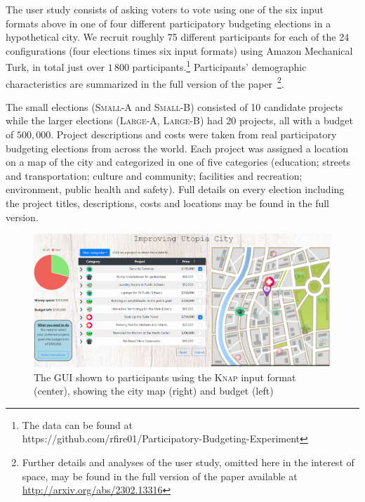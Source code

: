 \documentclass[letterpaper]{article} %
\newcommand{\kibitz}[2]{\ifnum\Comments=1{\color{#1}{#2}}\fi}
\newcommand{\gb}[1]{\kibitz{brown}{[GB:#1]}}
\newcommand{\knap}{\textsc{Knap}}
\begin{document}
The user study consists of asking voters to vote using one of the six input formats above in one of four different participatory budgeting elections in a hypothetical city. 
We recruit roughly 75  different participants for each of the 24 configurations (four elections times six input formats)   using Amazon Mechanical Turk, in total  just over $1\,800$ participants.\footnote{The data can be found at\\ https://github.com/rfire01/Participatory-Budgeting-Experiment} Participants' demographic characteristics are summarized in the full version of the paper~\footnote{Further details and analyses of the user study, omitted here in the interest of space, may be found in the full version of the paper available at \url{http://arxiv.org/abs/2302.13316}}.   

The small elections (\textsc{Small-A} and  \textsc{Small-B}) consisted of 10 candidate projects while the larger elections  (\textsc{Large-A},  \textsc{Large-B}) had 20 projects, all with a budget of $500,000$.
Project descriptions and costs were taken from real participatory budgeting elections from across the world. \gb{I removed the footnote - doesn't make sense to just giev 1. }  %
Each project was assigned a location on a map of the  city  and categorized in one of five  categories   (education; streets and transportation; culture and community; facilities and recreation; environment, public health and safety). 
Full  details  on every election including the project titles, descriptions,  costs and locations may be found in the full version.

 \begin{figure}[h]
\begin{center}
\includegraphics[clip, trim=0 3mm 0 0, width=13cm]{experiment/full system.PNG}
\caption{The GUI shown to participants using the \knap{}  input format (center), showing  the city map (right) and budget (left)
}\label{fig:interface}
\end{center}
\end{figure}
\end{document}
